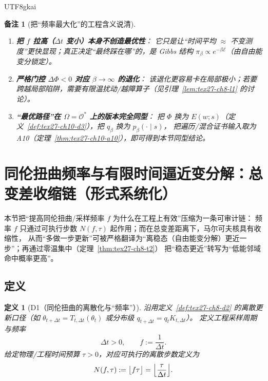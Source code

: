 \documentclass[12pt]{article}
\newtheorem{definition}{定义}[section]
\newtheorem{remark}{备注}[section]
\begin{document}
\begin{CJK*}{UTF8}{gkai}
\begin{remark}[把“频率最大化”的工程含义说清]
\label{rem:tex27-ch20-r1}
\begin{enumerate}
  \item \textbf{把 $f$ 拉高（$\Delta t$ 变小）本身不创造最优性}：
  它只是让“时间平均 $\approx$ 不变测度”更快显现；真正决定“最终踩在哪”的，是 Gibbs 结构
  $\pi_\beta\propto e^{-\beta\mathcal{E}}$（由自由能变分锁定）。
  \item \textbf{严格门控 $\Delta\Phi<0$ 对应 $\beta\to\infty$ 的退化}：
  该退化更容易卡在局部极小；若要跨越局部陷阱，需要有限温扰动/越障算子（见引理~\ref{lem:tex27-ch8-l1} 的讨论）。
  \item \textbf{“最优路径”在 $\Omega=\mathcal{O}^*$ 上的版本完全同型}：
  把 $\Phi$ 换为 $E(w;s)$（定义~\ref{def:tex27-ch10-d3}），把 $q_\beta$ 换为 $p_\beta(\cdot\mid s)$，
  把遍历/混合证书输入取为 A10（定理~\ref{thm:tex27-ch10-a10}），即可得到本节同型结论。
\end{enumerate}
\end{remark}

\clearpage

\section{同伦扭曲频率与有限时间逼近变分解：总变差收缩链（形式系统化）}
\label{sec:tex27-ch21-frequency-tv-variational}

本节把“提高同伦扭曲/采样频率 $f$ 为什么在工程上有效”压缩为一条可审计链：
频率 $f$ 只通过可执行步数 $N(f,\tau)$ 起作用；而在总变差距离下，马尔可夫核具有收缩性，
从而“多做一步更新”可被严格翻译为“离稳态（自由能变分解）更近一步”；再通过零温集中（定理~\ref{thm:tex27-ch8-t2}）
把“稳态更近”转写为“低能邻域命中概率更高”。

\subsection{定义}
\label{subsec:tex27-ch21-defs}

\begin{definition}[D1（同伦扭曲的离散化与“频率”）]
\label{def:tex27-ch21-d1}
沿用定义~\ref{def:tex27-ch8-d2} 的离散更新口径（如 $\theta_{t+\Delta t}=T_{t,\Delta t}(\theta_t)$ 或分布级 $q_{t+\Delta t}=q_tK_{t,\Delta
  t}$）。
定义工程采样周期与频率
\[
  \Delta t>0,
  \qquad
  f:=\frac{1}{\Delta t}.
\]
给定物理/工程时间预算 $\tau>0$，对应可执行的离散步数定义为
\[
  N(f,\tau):=\bigl\lfloor f\tau\bigr\rfloor=\Bigl\lfloor\frac{\tau}{\Delta t}\Bigr\rfloor.
\]
\end{definition}


\end{CJK*}
\end{document}
